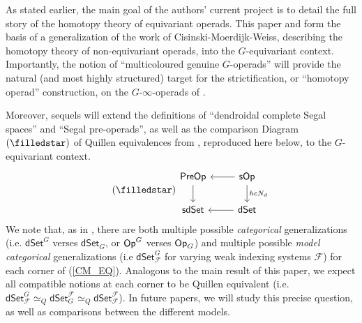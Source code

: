 \documentclass[a4paper,10pt]{article}%
\begin{document}
As stated earlier, the main goal of the authors' current project is to detail the full story of the homotopy theory of equivariant operads. This paper and \cite{Pe17} form the basis of a generalization of the work of Cisinski-Moerdijk-Weiss, describing the homotopy theory of non-equivariant operads, into the $G$-equivariant context. 
Importantly, the notion of ``multicoloured genuine $G$-operads'' will provide the natural (and most highly structured) target for the strictification, or ``homotopy operad'' construction, on the $G$-$\infty$-operads of \cite{Pe17}. 

Moreover, sequels will extend the definitions of ``dendroidal complete Segal spaces'' and ``Segal pre-operads'', as well as the comparison Diagram $(\filledstar)$ of Quillen equivalences from \cite{CM13b}, reproduced here below, to the $G$-equivariant context. 
\begin{equation}
  \label{CM_EQ}
  \tag{$\filledstar$}
  \begin{tikzcd}
    \mathsf{PreOp} \arrow[d] & \mathsf{sOp} \arrow[l] \arrow[d, "hcN_d"]\\
    \mathsf{sdSet} & \mathsf{dSet} \arrow[l]
  \end{tikzcd}
\end{equation}
We note that, as in \cite{Pe17}, there are both multiple possible \textit{categorical} generalizations (i.e. $\mathsf{dSet}^G$ verses $\mathsf{dSet}_G$, or $\mathsf{Op}^G$ verses $\mathsf{Op}_G$) and multiple possible \textit{model categorical} generalizations (i.e $\mathsf{dSet}^G_{\mathcal F}$ for varying weak indexing systems ${\mathcal F}$) for each corner of (\ref{CM_EQ}). Analogous to the main result of this paper, we expect all compatible notions at each corner to be Quillen equivalent (i.e. $\mathsf{dSet}^G_{\mathcal F} \simeq_Q \mathsf{dSet}_G^{\mathcal F} \simeq_Q \mathsf{dSet}_{\mathcal F}^{\mathcal F}$). In future papers, we will study this precise question, as well as comparisons between the different models.
\end{document}
